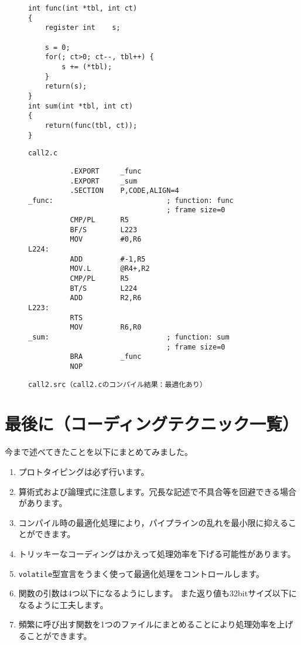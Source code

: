 \documentclass[a4j,10pt,fleqn]{jsarticle}
\begin{document}
\begin{figure}[tpb]
\begin{boxnote}
{\small\begin{verbatim}
int func(int *tbl, int ct)
{
    register int    s;

    s = 0;
    for(; ct>0; ct--, tbl++) {
        s += (*tbl);
    }
    return(s);
}
int sum(int *tbl, int ct)
{
    return(func(tbl, ct));
}
\end{verbatim}}
\end{boxnote}
\caption{\texttt{call2.c}} \label{fig:call2.c}
\end{figure}
\begin{figure}[tpb]
\begin{boxnote}
{\small\begin{verbatim}
          .EXPORT     _func
          .EXPORT     _sum
          .SECTION    P,CODE,ALIGN=4
_func:                           ; function: func
                                 ; frame size=0
          CMP/PL      R5
          BF/S        L223
          MOV         #0,R6
L224:
          ADD         #-1,R5
          MOV.L       @R4+,R2
          CMP/PL      R5
          BT/S        L224
          ADD         R2,R6
L223:
          RTS
          MOV         R6,R0
_sum:                            ; function: sum
                                 ; frame size=0
          BRA         _func
          NOP
\end{verbatim}}
\end{boxnote}
\caption{\texttt{call2.src（call2.cのコンパイル結果：最適化あり）}} \label{fig:call2.src}
\end{figure}


\clearpage
\section{最後に（コーディングテクニック一覧）}

今まで述べてきたことを以下にまとめてみました。

\begin{enumerate}
\item プロトタイピングは必ず行います。
\item 算術式および論理式に注意します。冗長な記述で不具合等を回避できる場合があります。
\item コンパイル時の最適化処理により，パイプラインの乱れを最小限に抑えることができます。
\item トリッキーなコーディングはかえって処理効率を下げる可能性があります。
\item \texttt{volatile}型宣言をうまく使って最適化処理をコントロールします。
\item 関数の引数は4つ以下になるようにします。
    また返り値も32bitサイズ以下になるように工夫します。
\item 頻繁に呼び出す関数を1つのファイルにまとめることにより処理効率を上げることができます。
\end{enumerate}
\end{document}
